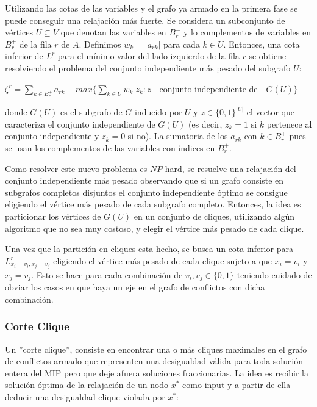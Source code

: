 Utilizando las cotas de las variables y el grafo ya armado en la primera fase se puede conseguir una relajaci\'on m\'as fuerte. Se considera un subconjunto de v\'ertices $U \subseteq V$ que denotan las variables en $B^-_r$ y lo complementos de variables en $B^+_r$ de la fila $r$ de $A$. Definimos $w_k = |a_{rk}|$ para cada $k\in U$. Entonces, una cota inferior de $L^r$ para el m\'inimo valor del lado izquierdo de la fila $r$ se obtiene resolviendo el problema del conjunto independiente m\'as pesado del subgrafo $U$:
\begin{center}
$\zeta^r = \sum_{k\in B^+_r}a_{rk} - max\{\sum_{k\in U}w_k\;z_k : z\quad$conjunto independiente de$\quad G(U)\}$
\end{center}

donde $G(U)$ es el subgrafo de $G$ inducido por $U$ y $z\in \{0,1\}^|U|$ el vector que caracteriza el conjunto independiente de $G(U)$ (es decir, $z_k = 1$ si $k$ pertenece al conjunto independiente y $z_k = 0$ si no). La sumatoria de los $a_{rk}$ con $k\in B^+_r$ pues se usan los complementos de las variables con \'indices en $B^+_r$. 

Como resolver este nuevo problema es $NP$-hard, se resuelve una relajaci\'on del conjunto independiente m\'as pesado observando que si un grafo consiste en subgrafos completos disjuntos el conjunto independiente \'optimo se consigue eligiendo el v\'ertice m\'as pesado de cada subgrafo completo. Entonces, la idea es particionar los v\'ertices de $G(U)$ en un conjunto de cliques, utilizando alg\'un algoritmo que no sea muy costoso, y elegir el v\'ertice m\'as pesado de cada clique.

Una vez que la partici\'on en cliques esta hecho, se busca un cota inferior para $L^r_{x_i=v_i,x_j=v_j}$ eligiendo el v\'ertice m\'as pesado de cada clique sujeto a que $x_i = v_i$ y $x_j = v_j$. Esto se hace para cada combinaci\'on de $v_i,v_j\in \{0,1\}$ teniendo cuidado de obviar los casos en que haya un eje en el grafo de conflictos con dicha combinaci\'on.

\subsubsection*{Corte Clique}

Un ''corte clique'', consiste en encontrar una o m\'as cliques maximales en el grafo de conflictos armado que representen una desigualdad válida para toda solución entera del MIP pero que deje afuera soluciones fraccionarias. La idea es recibir la solución óptima de la relajación de un nodo $x^*$ como input y a partir de ella deducir una desigualdad clique violada por $x^*$:\\

